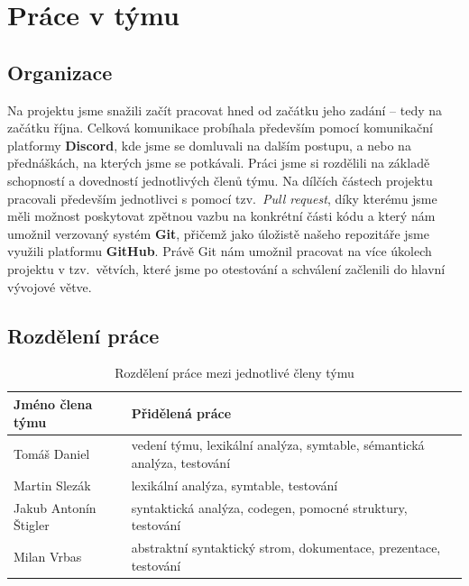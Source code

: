 \documentclass[a4paper, 12pt]{article} %
\begin{document}
    \newpage
    \section{Práce v týmu}
        \subsection{Organizace}
            Na projektu jsme snažili začít pracovat hned od začátku jeho zadání -- tedy
            na začátku října. Celková komunikace probíhala především pomocí komunikační
            platformy \textbf{Discord}, kde jsme se domluvali na dalším postupu, a nebo
            na přednáškách, na kterých jsme se potkávali. Práci jsme si rozdělili na
            základě schopností a dovedností jednotlivých členů týmu. Na dílčích částech
            projektu pracovali především jednotlivci s pomocí tzv.\ \textit{Pull request},
            díky kterému jsme měli možnost poskytovat zpětnou vazbu na konkrétní části kódu
            a který nám umožnil verzovaný systém \textbf{Git}, přičemž jako úložistě
            našeho repozitáře jsme využili platformu \textbf{GitHub}. Právě Git nám umožnil
            pracovat na více úkolech projektu v tzv.\ větvích, které jsme po otestování a
            schválení začlenili do hlavní vývojové větve.

        \subsection{Rozdělení práce}
            \begin{table}[htbp]
                \centering
                \begin{tabular}{| l | l |}
                    \hline
                    \textbf{Jméno člena týmu} & \textbf{Přidělená práce} \\
                    \hline
                    Tomáš Daniel            &  vedení týmu, lexikální analýza, symtable, sémantická
                                                analýza, testování\\
                    Martin Slezák           &  lexikální analýza, symtable, testování\\
                    Jakub Antonín Štigler   &  syntaktická analýza, codegen, pomocné struktury, testování\\
                    Milan Vrbas             &  abstraktní syntaktický strom, dokumentace, prezentace, testování \\
                    \hline
                \end{tabular}
                \caption{Rozdělení práce mezi jednotlivé členy týmu}
            \end{table}
\end{document}
